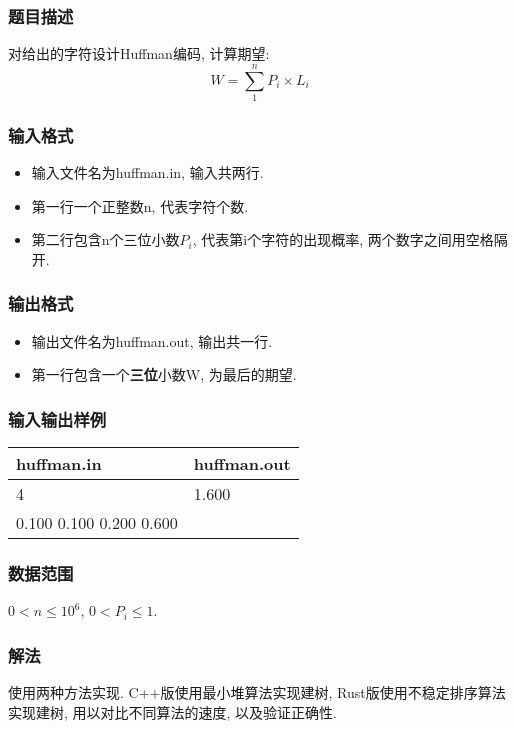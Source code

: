 \subsubsection{题目描述}
对给出的字符设计Huffman编码, 计算期望:
\begin{equation}
	W = \sum_1^n{P_i \times L_i}
	\label{eq:huf-exp}
\end{equation}
\subsubsection{输入格式}
\begin{itemize}
	\item 输入文件名为huffman.in, 输入共两行.
	\item 第一行一个正整数n, 代表字符个数.
	\item 第二行包含n个三位小数$P_i$, 代表第i个字符的出现概率,
	      两个数字之间用空格隔开.
\end{itemize}

\subsubsection{输出格式}
\begin{itemize}
	\item 输出文件名为huffman.out, 输出共一行.
	\item 第一行包含一个\textbf{三位}小数W, 为最后的期望.
\end{itemize}

\subsubsection{输入输出样例}
\label{sec:iosample}
\begin{table}[h!]
	\centering
	\begin{tabular}{|l|l|}
		\hline
		huffman.in              & huffman.out \\
		\hline
		4                       & 1.600       \\
		0.100 0.100 0.200 0.600 & ~           \\
		\hline
	\end{tabular}
\end{table}

\subsubsection{数据范围}
$0 < n \leq 10^6$,
$0<P_i \leq 1$.

\subsubsection{解法}
使用两种方法实现. C++版使用最小堆算法实现建树, Rust版使用不稳定排序算法实现建树,
用以对比不同算法的速度, 以及验证正确性.

